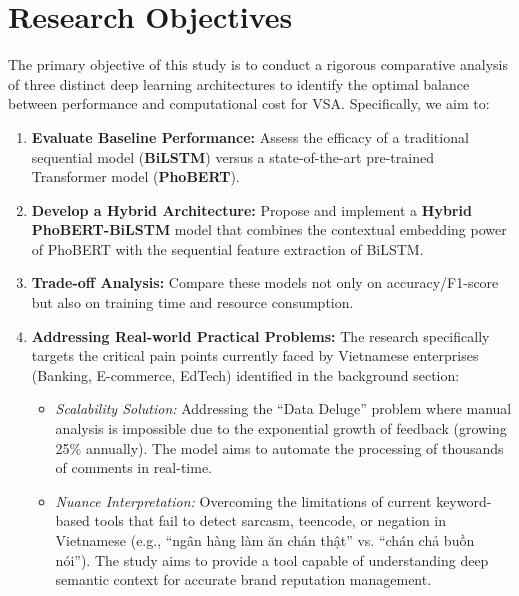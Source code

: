 \documentclass[12pt]{report} %
\begin{document}
\section{Research Objectives}
The primary objective of this study is to conduct a rigorous comparative analysis of three distinct deep learning architectures to identify the optimal balance between performance and computational cost for VSA. Specifically, we aim to:
\begin{enumerate}
    \item \textbf{Evaluate Baseline Performance:} Assess the efficacy of a traditional sequential model (\textbf{BiLSTM}) versus a state-of-the-art pre-trained Transformer model (\textbf{PhoBERT}).
    \item \textbf{Develop a Hybrid Architecture:} Propose and implement a \textbf{Hybrid PhoBERT-BiLSTM} model that combines the contextual embedding power of PhoBERT with the sequential feature extraction of BiLSTM.
    \item \textbf{Trade-off Analysis:} Compare these models not only on accuracy/F1-score but also on training time and resource consumption.
    \item \textbf{Addressing Real-world Practical Problems:}
          The research specifically targets the critical pain points currently faced by Vietnamese enterprises (Banking, E-commerce, EdTech) identified in the background section:
          \begin{itemize}
              \item \textit{Scalability Solution:} Addressing the ``Data Deluge'' problem where manual analysis is impossible due to the exponential growth of feedback (growing 25\% annually). The model aims to automate the processing of thousands of comments in real-time.
              \item \textit{Nuance Interpretation:} Overcoming the limitations of current keyword-based tools that fail to detect sarcasm, teencode, or negation in Vietnamese (e.g., \foreignlanguage{vietnamese}{``ngân hàng làm ăn chán thật''} vs. \foreignlanguage{vietnamese}{``chán chả buồn nói''}). The study aims to provide a tool capable of understanding deep semantic context for accurate brand reputation management.
          \end{itemize}


\end{enumerate}
\end{document}
